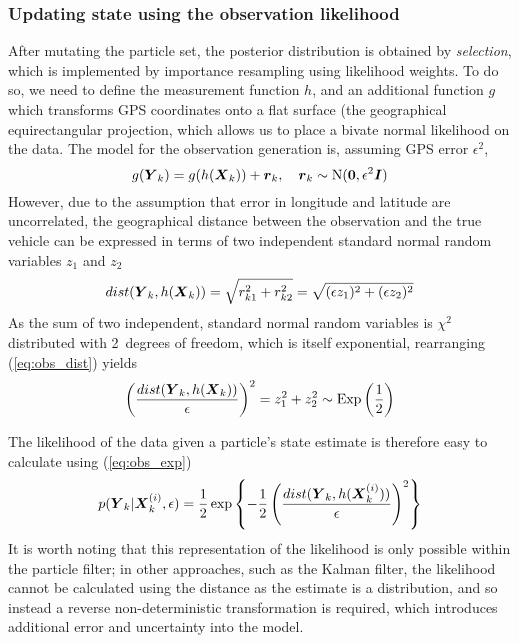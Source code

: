 \subsubsection{Updating state using the observation likelihood}
\label{sec:pf_update}

After mutating the particle set, the posterior distribution is obtained by
\emph{selection}, which is implemented by importance resampling using
likelihood weights.
To do so, we need to define the measurement function $h$,
and an additional function $g$ which transforms GPS coordinates onto a flat
surface (the geographical equirectangular projection,
which allows us to place a bivate normal likelihood on the data.
The model for the observation generation is,
assuming GPS error $\epsilon^2$,
\begin{equation}
\label{eq:pf_obs_model}
g(\mbox{$\boldsymbol{Y}$}_k) = g(h(\mbox{$\boldsymbol{X}$}_k)) + \boldsymbol{r}_k,
\quad \boldsymbol{r}_k \sim \mathrm{N}(\boldsymbol{0}, \epsilon^2\boldsymbol{I})
\end{equation}
However, due to the assumption that error in longitude and latitude are uncorrelated, 
the geographical distance between the observation and the true vehicle can be expressed
in terms of two independent standard normal random variables $z_1$ and $z_2$
\begin{equation}
\label{eq:obs_dist}
dist(\mbox{$\boldsymbol{Y}$}_k, h(\mbox{$\boldsymbol{X}$}_k)) = \sqrt{r_{k1}^2 + r_{k2}^2} 
    = \sqrt{(\epsilon z_1)^2 + (\epsilon z_2)^2}
\end{equation}
As the sum of two independent, standard normal random variables 
is $\chi^2$ distributed with 2~degrees of freedom,
which is itself exponential,
rearranging (\ref{eq:obs_dist}) yields
\begin{equation}
\label{eq:obs_exp}
\left(\frac{dist(\mbox{$\boldsymbol{Y}$}_k, h(\mbox{$\boldsymbol{X}$}_k))}{\epsilon}\right)^2 =
z_1^2 + z_2^2 \sim \mathrm{Exp}\left(\frac{1}{2}\right)
\end{equation}

The likelihood of the data given a particle's state estimate 
is therefore easy to calculate using (\ref{eq:obs_exp})
\begin{equation}
p(\mbox{$\boldsymbol{Y}$}_k | \mbox{$\boldsymbol{X}$}_k^{(i)}, \epsilon) =
\frac{1}{2}\exp\left\{
-\frac{1}{2} \left(\frac{dist(\mbox{$\boldsymbol{Y}$}_k, h(\mbox{$\boldsymbol{X}$}_k^{(i)}))}{\epsilon}\right)^2
\right\}
\end{equation}
It is worth noting that this representation of the likelihood is only
possible within the particle filter;
in other approaches, such as the Kalman filter,
the likelihood cannot be calculated using the distance as the estimate
is a distribution, and so instead a reverse non-deterministic transformation
is required, which introduces additional error and uncertainty into the model.

